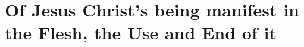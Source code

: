 \documentclass[../main.tex]{subfiles}
\begin{document}
	
	\chapter{Of Jesus Christ's being manifest in the Flesh, the Use and End of it}
	
	
	
	\theendnotes
	\setcounter{endnote}{0}
\end{document}
